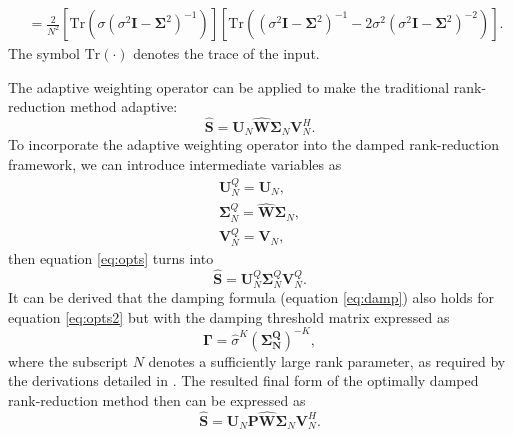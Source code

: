 {{\begin{equation}
\begin{split}
&=\frac{2}{N^2}\left[ \text{Tr}\left(\sigma(\sigma^2\mathbf{I}-\boldsymbol{\Sigma}^2)^{-1}\right)\right]\left[ \text{Tr}\left((\sigma^2\mathbf{I}-\boldsymbol{\Sigma}^2)^{-1}-2\sigma^2(\sigma^2\mathbf{I}-\boldsymbol{\Sigma}^2)^{-2}\right)\right].
\end{split}
\end{equation}
}
The symbol $\text{Tr}(\cdot)$ denotes the trace of the input. 

 The adaptive weighting operator can be applied to make the traditional rank-reduction method adaptive:
\begin{equation}
\label{eq:opts}
\hat{\mathbf{S}}=\mathbf{U}_N\hat{\mathbf{W}}\boldsymbol{\Sigma}_N\mathbf{V}_N^H.
\end{equation}
To incorporate the adaptive weighting operator into the damped rank-reduction framework, we can introduce intermediate variables as 
\begin{align}
\label{eq:svds_qu}
\mathbf{U}_N^{Q} = \mathbf{U}_N,\\
\label{eq:svds_qs}
\boldsymbol{\Sigma}_N^{Q} = \hat{\mathbf{W}}\boldsymbol{\Sigma}_N,\\
\label{eq:svds_qv}
\mathbf{V}_N^{Q} = \mathbf{V}_N,
\end{align}
then equation \ref{eq:opts} turns into 
\begin{equation}
\label{eq:opts2}
\hat{\mathbf{S}}=\mathbf{U}_N^{Q}\boldsymbol{\Sigma}_N^{Q}\mathbf{V}_N^{Q}.
\end{equation}
It can be derived that the damping formula (equation \ref{eq:damp}) also holds for equation \ref{eq:opts2} but with the damping threshold matrix expressed as
\begin{equation}
\label{eq:dampt}
\boldsymbol{\Gamma} = \hat{\sigma}^K\left(\boldsymbol{\Sigma_N^Q}\right)^{-K},
\end{equation}
where the subscript $N$ denotes a sufficiently large rank parameter, as required by the derivations detailed in \cite{yangkang2019gji5d}.  The resulted final form of the optimally damped rank-reduction method then can be expressed as 
\begin{equation}
\label{eq:odrr}
\hat{\mathbf{S}} = \mathbf{U}_N\mathbf{P}\hat{\mathbf{W}}\boldsymbol{\Sigma}_N\mathbf{V}_N^H.

\end{equation}}
